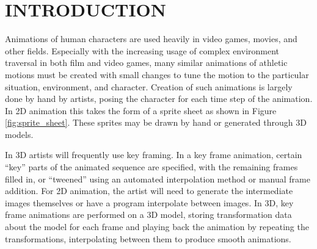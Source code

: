 
 
\chapter{INTRODUCTION}
\label{chapter:intro}

Animations of human characters are used heavily in video games, movies, and other fields.  Especially with the increasing usage of complex environment traversal in both film and video games, many similar animations of athletic motions must be created with small changes to tune the motion to the particular situation, environment, and character.  Creation of such animations is largely done by hand by artists, posing the character for each time step of the animation.  In 2D animation this takes the form of a sprite sheet as shown in Figure \ref{fig:sprite_sheet}.  These sprites may be drawn by hand or generated through 3D models.

In 3D artists will frequently use key framing.  In a key frame animation, certain ``key'' parts of the animated sequence are specified, with the remaining frames filled in, or ``tweened'' using an automated interpolation method or manual frame addition.  For 2D animation, the artist will need to generate the intermediate images themselves or have a program interpolate between images.  In 3D, key frame animations are performed on a 3D model, storing transformation data about the model for each frame and playing back the animation by repeating the transformations, interpolating between them to produce smooth animations.

